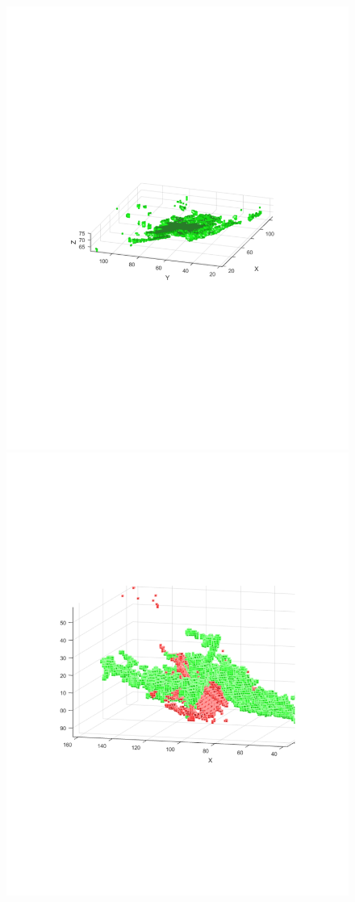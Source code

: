 \documentclass{UCF_ETD}
\begin{document}
\begin{figure}[H]
\begin{center}
\includegraphics[scale=0.4]{RobustRegistration/Scan35}
\includegraphics[scale=0.48]{RobustRegistration/Scan1-2FailedRegistration}

\end{center}
\end{figure}
\end{document}
